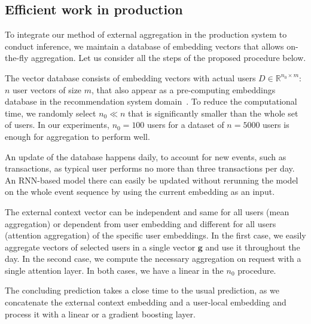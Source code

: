 \subsection{Efficient work in production} 
\label{sec:prod_efficient}


To integrate our method of external aggregation in the production system to conduct inference, 
we maintain a database of embedding vectors that allows on-the-fly aggregation.
Let us consider all the steps of the proposed procedure below.

The vector database consists of embedding vectors with actual users $D \in \mathbb{R}^{n_0 \times m}$: $n$ user vectors of size $m$, that also appear as a pre-computing embeddings database in the recommendation system domain~\cite{zanardi2011dynamic}. 
To reduce the computational time, we randomly select $n_0 \ll n$ that is significantly smaller than the whole set of users.
In our experiments, $n_0 = 100$ users for a dataset of $n = 5000$ users is enough for aggregation to perform well. 

An update of the database happens daily, to account for new events, such as transactions, as typical user performs no more than three transactions per day. 
An RNN-based model there can easily be updated without rerunning the model on the whole event sequence by using the current embedding as an input. 

The external context vector can be independent and same for all users (mean aggregation) or dependent from user embedding and different for all users (attention aggregation) of the specific user embeddings.  
In the first case, we easily aggregate vectors of selected users in a single vector $\mathbf{g}$ and use it throughout the day.
In the second case, we compute the necessary aggregation on request with a single attention layer.
In both cases, we have a linear in the $n_0$ procedure.

The concluding prediction takes a close time to the usual prediction, as we concatenate the external context embedding and a user-local embedding and process it with a linear or a gradient boosting layer.  

